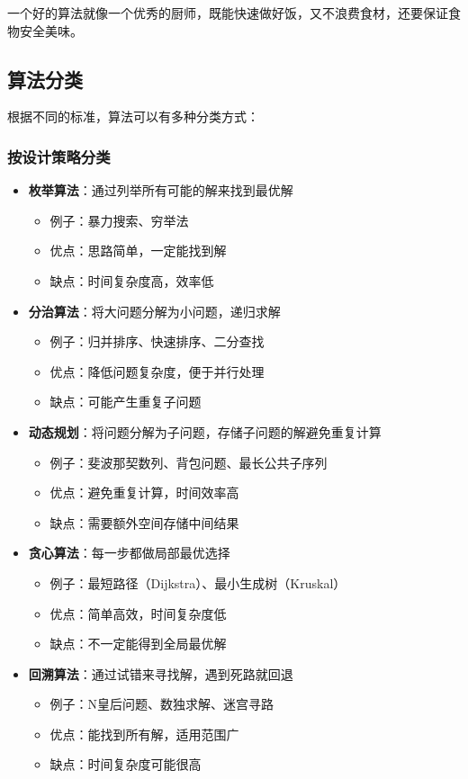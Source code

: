 \documentclass[lang=cn,newtx,10pt,scheme=chinese]{../elegantbook}
\begin{document}
一个好的算法就像一个优秀的厨师，既能快速做好饭，又不浪费食材，还要保证食物安全美味。

\subsection{算法分类}
根据不同的标准，算法可以有多种分类方式：

\subsubsection{按设计策略分类}
\begin{itemize}
    \item \textbf{枚举算法}：通过列举所有可能的解来找到最优解
    \begin{itemize}
        \item 例子：暴力搜索、穷举法
        \item 优点：思路简单，一定能找到解
        \item 缺点：时间复杂度高，效率低
    \end{itemize}
    
    \item \textbf{分治算法}：将大问题分解为小问题，递归求解
    \begin{itemize}
        \item 例子：归并排序、快速排序、二分查找
        \item 优点：降低问题复杂度，便于并行处理
        \item 缺点：可能产生重复子问题
    \end{itemize}
    
    \item \textbf{动态规划}：将问题分解为子问题，存储子问题的解避免重复计算
    \begin{itemize}
        \item 例子：斐波那契数列、背包问题、最长公共子序列
        \item 优点：避免重复计算，时间效率高
        \item 缺点：需要额外空间存储中间结果
    \end{itemize}
    
    \item \textbf{贪心算法}：每一步都做局部最优选择
    \begin{itemize}
        \item 例子：最短路径（Dijkstra）、最小生成树（Kruskal）
        \item 优点：简单高效，时间复杂度低
        \item 缺点：不一定能得到全局最优解
    \end{itemize}
    
    \item \textbf{回溯算法}：通过试错来寻找解，遇到死路就回退
    \begin{itemize}
        \item 例子：N皇后问题、数独求解、迷宫寻路
        \item 优点：能找到所有解，适用范围广
        \item 缺点：时间复杂度可能很高
    \end{itemize}
\end{itemize}
\end{document}
